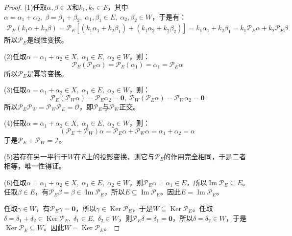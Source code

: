 \begin{proof}
	(1)任取$\alpha,\beta\in X$和$k_1,k_2\in F$，其中$\alpha=\alpha_1+\alpha_2,\;\beta=\beta_1+\beta_2,\;\alpha_1,\beta_1\in E,\;\alpha_2,\beta_2\in W$，于是有：
	\begin{align*}
		\mathcal{P}_E(k_1\alpha+k_2\beta)
		=\mathcal{P}_E[(k_1\alpha_1+k_2\beta_1)+(k_1\alpha_2+k_2\beta_2)]
		=k_1\alpha_1+k_2\beta_1
		=k_1\mathcal{P}_E\alpha+k_2\mathcal{P}_E\beta
	\end{align*}
	所以$\mathcal{P}_E$是线性变换。\par
	(2)任取$\alpha=\alpha_1+\alpha_2\in X,\;\alpha_1\in E,\;\alpha_2\in W$，则：
	\begin{equation*}
		\mathcal{P}_E(\mathcal{P}_E\alpha)=\mathcal{P}_E(\alpha_1)=\alpha_1=\mathcal{P}_E\alpha
	\end{equation*}
	所以$\mathcal{P}_E$是幂等变换。\par
	(3)任取$\alpha=\alpha_1+\alpha_2\in X,\;\alpha_1\in E,\;\alpha_2\in W$，则：
	\begin{equation*}
		\mathcal{P}_E(\mathcal{P}_W\alpha)=\mathcal{P}_E\alpha_2=\mathbf{0},\;
		\mathcal{P}_W(\mathcal{P}_E\alpha)=\mathcal{P}_W\alpha_2=\mathbf{0}
	\end{equation*}
	所以$\mathcal{P}_E\mathcal{P}_W=\mathcal{P}_W\mathcal{P}_E=\mathcal{O}$，即$\mathcal{P}_E$与$\mathcal{P}_W$正交。\par
	(4)任取$\alpha=\alpha_1+\alpha_2\in X,\;\alpha_1\in E,\;\alpha_2\in W$，则：
	\begin{equation*}
		(\mathcal{P}_E+\mathcal{P}_W)\alpha=\mathcal{P}_E\alpha+\mathcal{P}_W\alpha=\alpha_1+\alpha_2=\alpha
	\end{equation*}
	于是$\mathcal{P}_E+\mathcal{P}_W=\mathcal{I}$。\par
	(5)若存在另一平行于$W$在$E$上的投影变换，则它与$\mathcal{P}_E$的作用完全相同，于是二者相等，唯一性得证。\par
	(6)任取$\alpha=\alpha_1+\alpha_2\in X,\;\alpha_1\in E,\;\alpha_2\in W$，则$\mathcal{P}_E\alpha=\alpha_1\in E$，所以$\operatorname{Im}\mathcal{P}_E\subseteq E$。任取$\beta\in E$，有$\mathcal{P}_E\beta=\beta\in\operatorname{Im}\mathcal{P}_E$，所以$E\subseteq\operatorname{Im}\mathcal{P}_E$。因此$E=\operatorname{Im}\mathcal{P}_E$。\par
	任取$\gamma\in W$，有$\mathcal{P}_E\gamma=\mathbf{0}$，所以$\gamma\in\operatorname{Ker}\mathcal{P}_E$，于是$W\subseteq\operatorname{Ker}\mathcal{P}_E$。任取$\delta=\delta_1+\delta_2\in\operatorname{Ker}\mathcal{P}_E,\;\delta_1\in E,\;\delta_2\in W$，则$\mathcal{P}_E\delta=\delta_1=\mathbf{0}$，所以$\delta=\delta_2\in W$，于是$\operatorname{Ker}\mathcal{P}_E\subseteq W$。因此$W=\operatorname{Ker}\mathcal{P}_E$。\par

\end{proof}
